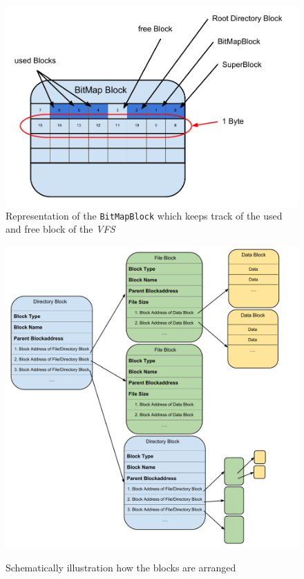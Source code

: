 \documentclass[a4paper,12pt]{article}
\begin{document}
\begin{figure}[!h]
\begin{center}
\includegraphics[scale=0.5]{images/BitMapBlock.pdf}
\caption{Representation of the \texttt{BitMapBlock} which keeps track of the used and free block of the \emph{VFS}}
\label{bitmapblock}

\end{center}
\end{figure}


\begin{figure}[!h]
\begin{center}
\includegraphics[scale=0.3]{images/Blocks.pdf}
\label{blocks}
\caption{Schematically illustration how the blocks are arranged}
\end{center}
\end{figure}
\end{document}

